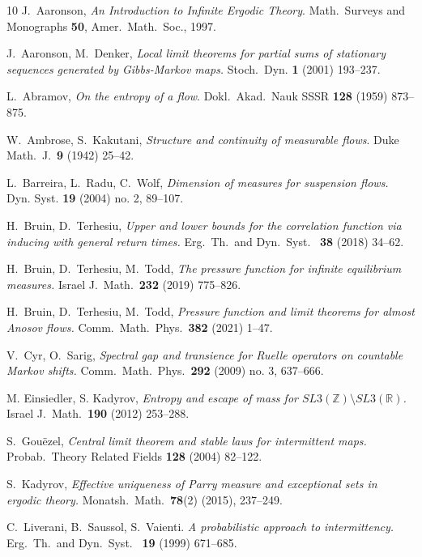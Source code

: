 \documentclass[12pt]{article}
\numberwithin{equation}{section}
\newcommand{\R}{\mathbb{R}}
\newcommand{\Z}{\mathbb{Z}}
\begin{document}
\begin{thebibliography}{10}
J.~Aaronson, \emph{{An Introduction to Infinite Ergodic Theory}}. Math.\ Surveys
  and Monographs \textbf{50}, Amer.\ Math.\ Soc., 1997.

 J.~Aaronson, M.~Denker,
\emph{Local limit theorems for partial sums of stationary sequences generated by Gibbs-Markov maps.} 
{Stoch.\ Dyn.} \textbf{1} (2001) 193--237.

 L.~Abramov,
\emph{On the entropy of a flow}.
Dokl.\ Akad.\ Nauk SSSR \textbf{128} (1959) 873--875.

 W.~Ambrose, S.~Kakutani,
\emph{Structure and continuity of measurable flows}.
Duke Math.\ J.\ \textbf{9} (1942) 25--42.

 L.\ Barreira, L.\ Radu,  C.\ Wolf,
\emph{Dimension of measures for suspension flows.}
Dyn. Syst. \textbf{19} (2004) no. 2, 89--107.

 H.\ Bruin, D.\ Terhesiu,
\emph{Upper and lower bounds for the correlation function via inducing with general return times.}
{Erg.\ Th.\ and Dyn.\ Syst.\ }  \textbf{38} (2018) 34--62.

 H.\ Bruin, D.\ Terhesiu, M.\ Todd,
\emph{The pressure function for infinite equilibrium measures.}
Israel J.\ Math.\ \textbf{232} (2019) 775--826. 

 H.\ Bruin, D.\ Terhesiu, M.\ Todd,
\emph{ Pressure function and limit theorems for almost Anosov flows.}
Comm.\ Math.\ Phys.\ \textbf{382} (2021) 1--47. 

 V.\ Cyr, O.\ Sarig, 
\emph{Spectral gap and transience for Ruelle operators on countable Markov shifts.} 
Comm.\ Math.\ Phys.\ \textbf{292} (2009) no. 3, 637--666.

 M. Einsiedler, S. Kadyrov, 
\emph{Entropy and escape of mass for $SL3(\Z) \setminus SL3(\R)$.} 
Israel J.\ Math.\ \textbf{190} (2012) 253--288.

 S.\ Gou\"ezel,
\emph{Central limit theorem and stable laws for intermittent maps.}
Probab.\ Theory Related Fields \textbf{128} (2004) 82--122.
  
  S.\ Kadyrov,  \emph{Effective uniqueness of Parry measure and exceptional sets in ergodic theory.} Monatsh.\ Math.\  \textbf{78}(2) (2015), 237--249.

C.~Liverani, B.~Saussol, S.~Vaienti.
\emph{A probabilistic approach to intermittency.}
{Erg.\ Th.\ and Dyn.\ Syst.\ } \textbf{19} (1999) 671--685.


\end{thebibliography}
\end{document}
